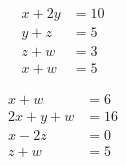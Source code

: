 \begin{puzzle}
    \begin{align*}
        x + 2y & = 10 \\
        y + z  & = 5  \\
        z + w  & = 3  \\
        x + w  & = 5
    \end{align*}
\end{puzzle}

\begin{puzzle}
    \begin{align*}
        x + w      & = 6  \\
        2x + y + w & = 16 \\
        x - 2z     & = 0  \\
        z + w      & = 5
    \end{align*}
\end{puzzle}
